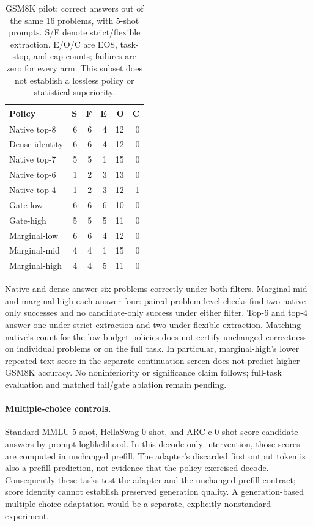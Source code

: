 \documentclass[10pt,twocolumn]{article}
\begin{document}
\begin{table}[t]\centering\footnotesize
\caption{GSM8K pilot: correct answers out of the same 16 problems, with 5-shot prompts. S/F denote strict/flexible extraction. E/O/C are EOS, task-stop, and cap counts; failures are zero for every arm. This subset does not establish a lossless policy or statistical superiority.}\label{tab:gsm-pilot}
\setlength{\tabcolsep}{3.5pt}
\begin{tabular}{lrrrrr}\toprule
Policy & S & F & E & O & C\\\midrule
Native top-8 & 6 & 6 & 4 & 12 & 0\\
Dense identity & 6 & 6 & 4 & 12 & 0\\
Native top-7 & 5 & 5 & 1 & 15 & 0\\
Native top-6 & 1 & 2 & 3 & 13 & 0\\
Native top-4 & 1 & 2 & 3 & 12 & 1\\
Gate-low & 6 & 6 & 6 & 10 & 0\\
Gate-high & 5 & 5 & 5 & 11 & 0\\
Marginal-low & 6 & 6 & 4 & 12 & 0\\
Marginal-mid & 4 & 4 & 1 & 15 & 0\\
Marginal-high & 4 & 4 & 5 & 11 & 0\\\bottomrule
\end{tabular}\end{table}

Native and dense answer six problems correctly under both filters. Marginal-mid and marginal-high each answer four: paired problem-level checks find two native-only successes and no candidate-only success under either filter. Top-6 and top-4 answer one under strict extraction and two under flexible extraction. Matching native's count for the low-budget policies does not certify unchanged correctness on individual problems or on the full task. In particular, marginal-high's lower repeated-text score in the separate continuation screen does not predict higher GSM8K accuracy. No noninferiority or significance claim follows; full-task evaluation and matched tail/gate ablation remain pending.

\paragraph{Multiple-choice controls.}
Standard MMLU 5-shot, HellaSwag 0-shot, and ARC-c 0-shot score candidate answers by prompt loglikelihood. In this decode-only intervention, those scores are computed in unchanged prefill. The adapter's discarded first output token is also a prefill prediction, not evidence that the policy exercised decode. Consequently these tasks test the adapter and the unchanged-prefill contract; score identity cannot establish preserved generation quality. A generation-based multiple-choice adaptation would be a separate, explicitly nonstandard experiment.
\end{document}
